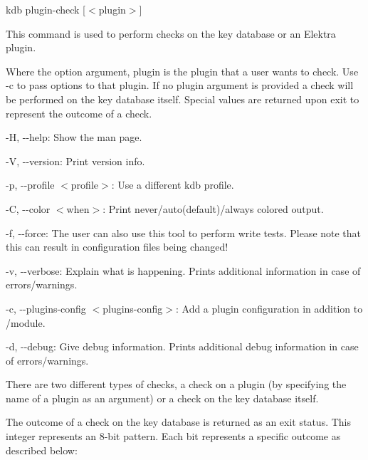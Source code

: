 {\ttfamily kdb plugin-\/check \mbox{[}$<$plugin$>$\mbox{]}}

This command is used to perform checks on the key database or an Elektra plugin.

Where the option argument, {\ttfamily plugin} is the plugin that a user wants to check. Use {\ttfamily -\/c} to pass options to that plugin. If no {\ttfamily plugin} argument is provided a check will be performed on the key database itself. Special values are returned upon exit to represent the outcome of a check.


\begin{DoxyItemize}
\item {\ttfamily -\/H}, {\ttfamily -\/-\/help}\+: Show the man page.
\item {\ttfamily -\/V}, {\ttfamily -\/-\/version}\+: Print version info.
\item {\ttfamily -\/p}, {\ttfamily -\/-\/profile $<$profile$>$}\+: Use a different kdb profile.
\item {\ttfamily -\/C}, {\ttfamily -\/-\/color $<$when$>$}\+: Print never/auto(default)/always colored output.
\item {\ttfamily -\/f}, {\ttfamily -\/-\/force}\+: The user can also use this tool to perform write tests. Please note that this can result in configuration files being changed!
\item {\ttfamily -\/v}, {\ttfamily -\/-\/verbose}\+: Explain what is happening. Prints additional information in case of errors/warnings.
\item {\ttfamily -\/c}, {\ttfamily -\/-\/plugins-\/config $<$plugins-\/config$>$}\+: Add a plugin configuration in addition to {\ttfamily /module}.
\item {\ttfamily -\/d}, {\ttfamily -\/-\/debug}\+: Give debug information. Prints additional debug information in case of errors/warnings.
\end{DoxyItemize}

There are two different types of checks, a check on a plugin (by specifying the name of a plugin as an argument) or a check on the key database itself.

The outcome of a check on the key database is returned as an exit status. This integer represents an 8-\/bit pattern. Each bit represents a specific outcome as described below\+:



